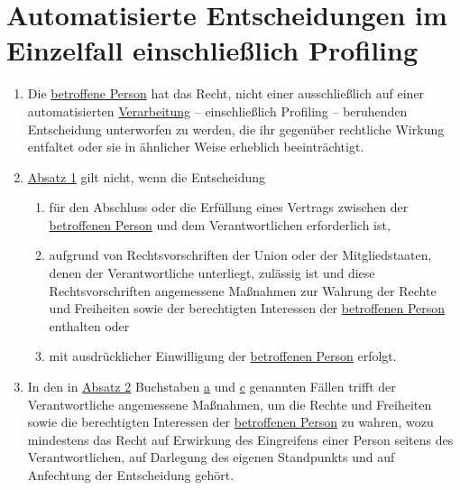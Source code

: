 \chapter{Automatisierte Entscheidungen im Einzelfall einschließlich Profiling}
\label{ch:22}


\begin{enumerate}

  \item Die \hyperref[itm:04-1]{betroffene Person} hat das Recht, nicht einer ausschließlich auf einer automatisierten \hyperref[itm:04-2]{Verarbeitung} --
   einschließlich Profiling -- beruhenden Entscheidung unterworfen zu werden, die ihr gegenüber rechtliche Wirkung
   entfaltet oder sie in ähnlicher Weise erheblich beeinträchtigt.
  \label{itm:22-1}

  \item \hyperref[itm:22-1]{Absatz 1} gilt nicht, wenn die Entscheidung
  \label{itm:22-2}

  \begin{enumerate}
  
    \item für den Abschluss oder die Erfüllung eines Vertrags zwischen der \hyperref[itm:04-1]{betroffenen Person} und dem Verantwortlichen
     erforderlich ist,
    \label{itm:22-2a}

    \item aufgrund von Rechtsvorschriften der Union oder der Mitgliedstaaten, denen der Verantwortliche unterliegt,
     zulässig ist und diese Rechtsvorschriften angemessene Maßnahmen zur Wahrung der Rechte und Freiheiten sowie der
     berechtigten Interessen der \hyperref[itm:04-1]{betroffenen Person} enthalten oder
    \label{itm:22-2b}

    \item mit ausdrücklicher Einwilligung der \hyperref[itm:04-1]{betroffenen Person} erfolgt.
    \label{itm:22-2c}

  \end{enumerate}

  \item In den in \hyperref[itm:22-2]{Absatz 2} Buchstaben \hyperref[itm:22-2a]{a} und \hyperref[itm:22-2c]{c} genannten
   Fällen trifft der Verantwortliche angemessene Maßnahmen, um die Rechte und Freiheiten sowie die berechtigten
   Interessen der \hyperref[itm:04-1]{betroffenen Person} zu wahren, wozu mindestens das Recht auf Erwirkung des Eingreifens einer Person
   seitens des Verantwortlichen, auf Darlegung des eigenen Standpunkts und auf Anfechtung der Entscheidung gehört.
  \label{itm:22-3}


\end{enumerate}
